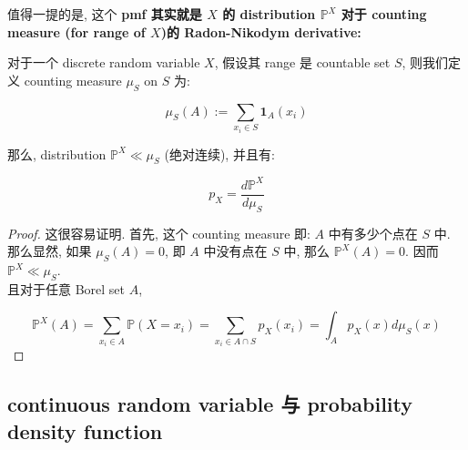 值得一提的是, 这个 \textbf{pmf 其实就是 \(\mathit{X}\) 的 distribution \(\mathbb{P}^{\mathit{X}}\) 对于 counting measure (for range of \(\mathit{X}\))的 Radon-Nikodym derivative:}

\begin{proposition}{}

对于一个 discrete random variable \(\mathit{X}\), 假设其 range 是 countable set \(\mathit{S}\), 则我们定义 counting measure \(\mathit{\mu}_{\mathit{S}}\) on \(\mathit{S}\) 为:

\[\mathit{\mu}_{\mathit{S}}(\mathit{A}) := \sum\limits_{\mathit{x}_{\mathit{i}} \in \mathit{S}}\mathbf{1}_{\mathit{A}}(\mathit{x}_{\mathit{i}})\]

那么, distribution \(\mathbb{P}^{\mathit{X}} \ll \mathit{\mu}_{\mathit{S}}\) (绝对连续), 并且有:

\[\mathit{p}_{\mathit{X}} = \frac{\mathit{d}\mathbb{P}^{\mathit{X}}}{\mathit{d}\mathit{\mu}_{\mathit{S}}}\]

\end{proposition}

\begin{proof}

这很容易证明. 首先, 这个 counting measure 即: \(\mathit{A}\) 中有多少个点在 \(\mathit{S}\) 中.\\
那么显然, 如果 \(\mathit{\mu}_{\mathit{S}}(\mathit{A}) = 0\), 即 \(\mathit{A}\) 中没有点在 \(\mathit{S}\) 中, 那么 \(\mathbb{P}^{\mathit{X}}(\mathit{A}) = 0\). 因而 \(\mathbb{P}^{\mathit{X}} \ll \mathit{\mu}_{\mathit{S}}\).\\
且对于任意 Borel set \(\mathit{A}\),

\[\mathbb{P}^{\mathit{X}}(\mathit{A}) = \sum\limits_{\mathit{x}_{\mathit{i}} \in \mathit{A}}\mathbb{P}(\mathit{X} = \mathit{x}_{\mathit{i}}) = \sum\limits_{\mathit{x}_{\mathit{i}} \in \mathit{A} \cap \mathit{S}}\mathit{p}_{\mathit{X}}(\mathit{x}_{\mathit{i}}) = \int_{\mathit{A}}\mathit{p}_{\mathit{X}}(\mathit{x})\mathit{d}\mathit{\mu}_{\mathit{S}}(\mathit{x})\]

\end{proof}

\subsection{continuous random variable 与 probability density function}\label{continuous-random-variable-ux4e0e-probability-density-function}

